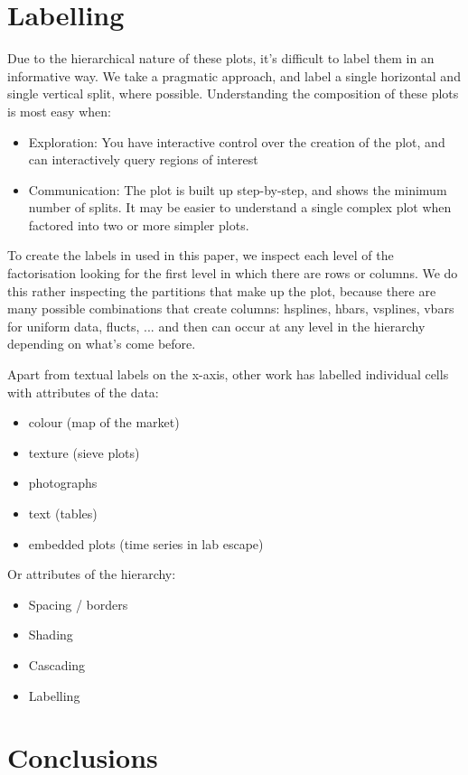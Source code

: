 \documentclass[letterpaper,oneside]{scrartcl}
\begin{document}
\section{Labelling}
\label{sec:legends}

Due to the hierarchical nature of these plots, it's difficult to label them in an informative way.  We take a pragmatic approach, and label a single horizontal and single vertical split, where possible.  Understanding the composition of these plots is most easy when:

\begin{itemize}

  \item Exploration: You have interactive control over the creation of the plot, and can interactively query regions of interest
  
  \item Communication: The plot is built up step-by-step, and shows the minimum number of splits.  It may be easier to understand a single complex plot when factored into two or more simpler plots.

\end{itemize}

To create the labels in used in this paper, we inspect each level of the factorisation looking for the first level in which there are rows or columns.  We do this rather inspecting the partitions that make up the plot, because there are many possible combinations that create columns: hsplines, hbars, vsplines, vbars for uniform data, flucts, ... and then can occur at any level in the hierarchy depending on what's come before.

Apart from textual labels on the x-axis, other work has labelled individual cells with attributes of the data:

\begin{itemize}
  \item colour (map of the market)
  \item texture (sieve plots)
  \item photographs
  \item text (tables)
  \item embedded plots (time series in lab escape)
\end{itemize}

Or attributes of the hierarchy:

\begin{itemize}
  \item Spacing / borders
  \item Shading
  \item Cascading
  \item Labelling
\end{itemize}

\section{Conclusions} %
\label{sec:conclusions}



\end{document}
